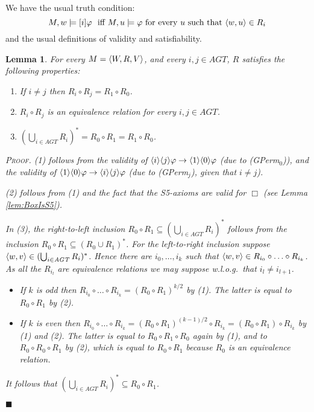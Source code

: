 \documentclass{article}
\newtheorem{lemma}{Lemma}
\newenvironment{pf}{\em \medskip\noindent \textsc{Proof.}}
{\hspace*{\fill}\nolinebreak[2]\hspace*{\fill}$\blacksquare$\medskip}
\renewcommand{\phi}{\varphi}
\newcommand{\cstit}[1]{[{#1}]}           \newcommand{\poscstit}[1]{\langle {#1} \rangle}    \newcommand{\dstit}[2]{[{#1}\ \mathit{dstit}\! :{#2}]}
\newcommand{\agtset}{\ensuremath{\mathit{AGT}}}
\begin{document}
We have the usual truth condition:
$$M,w\models \cstit{i}\phi \mbox{ \ iff\ }
  M,u\models\phi  \mbox{ for every } u \mbox{ such that } \tuple{w,u} \in R_i$$
and the usual definitions of validity and satisfiability.

\begin{lemma}\label{lem:prop-rel}
For every $M = \langle W, R, V \rangle $, and every $i,j \in \agtset$, $R$ satisfies
the following properties:
\begin{enumerate}
\item If $i \not = j$ then $R_i \circ R_j = R_1 \circ R_0 $.

\item $R_i \circ R_j $ is an equivalence relation for every $i,j \in \agtset$.

\item $ (\bigcup_{i \in \agtset} R_i)^*  =  R_0 \circ R_1 = R_1 \circ R_0 $.
\end{enumerate}

\begin{pf}
(1) follows from the validity of
$\poscstit{i}\poscstit{j}\phi \imp \poscstit{1}\poscstit{0}\phi$ (due to (GPerm$_0$)), and
the validity of
$\poscstit{1}\poscstit{0}\phi \imp \poscstit{i}\poscstit{j}\phi$ (due to (GPerm$_j$),
given that $i \not = j$).

(2) follows from (1) and the fact that the S5-axioms are valid for $\Box$
(see Lemma \ref{lem:BoxIsS5}).

In (3), the right-to-left inclusion
$R_0 \circ R_1 \subseteq (\bigcup_{i \in \agtset} R_i)^* $
follows from the inclusion
$R_0 \circ R_1 \subseteq (R_0 \cup R_1)^* $.
For the left-to-right inclusion
suppose $\tuple{w,v} \in (\bigcup_{i \in \agtset} R_i)^* $.
Hence there are $i_0,\ldots,i_k$ such that
$\langle w,v \rangle \in R_{i_0} \circ \ldots \circ R_{i_k} $.
As all the $R_{i_l}$ are equivalence relations we may suppose w.l.o.g.\ that
$i_l \not = i_{l+1} $.
\begin{itemize}
\item If $k$ is odd then
$R_{i_0} \circ \ldots \circ R_{i_k} = (R_0 \circ R_1)^{k/2} $ by (1).
The latter is equal to $R_0 \circ R_1$ by (2).

\item If $k$ is even then
$R_{i_0} \circ \ldots \circ R_{i_k} = (R_0 \circ R_1)^{(k-1)/2} \circ R_{i_k}
                                    = (R_0 \circ R_1)           \circ R_{i_k} $ by (1) and (2).
The latter is equal to                $R_0 \circ R_1           \circ R_{0} $ again by (1),
and to $R_0 \circ R_0           \circ R_{1} $ by (2),
which is equal to $R_0 \circ R_{1} $ because $R_0 $ is an equivalence relation.
\end{itemize}
It follows that $ (\bigcup_{i \in \agtset} R_i)^*  \subseteq  R_0 \circ R_1 $.

\end{pf}
\end{lemma}
\end{document}
